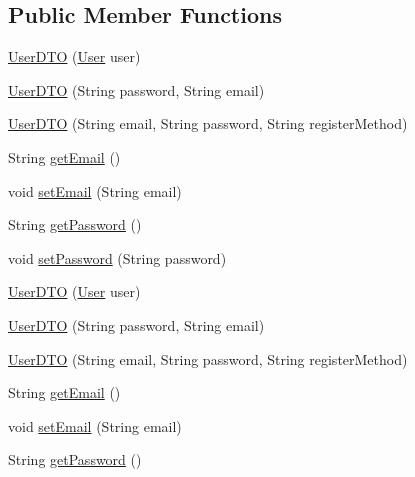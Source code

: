 \subsection*{Public Member Functions}
\begin{DoxyCompactItemize}
\item 
\mbox{\hyperlink{class_s_p_q_1_1dto_1_1_user_d_t_o_a40cad7b1dea2117ed4cb0e69fdc6b929}{User\+D\+TO}} (\mbox{\hyperlink{class_s_p_q_1_1data_1_1_user}{User}} user)
\item 
\mbox{\hyperlink{class_s_p_q_1_1dto_1_1_user_d_t_o_a985590805ac057d894623b83b1042e29}{User\+D\+TO}} (String password, String email)
\item 
\mbox{\hyperlink{class_s_p_q_1_1dto_1_1_user_d_t_o_a97b230ddb1c2eb2cbd7ced33922fb2d2}{User\+D\+TO}} (String email, String password, String register\+Method)
\item 
String \mbox{\hyperlink{class_s_p_q_1_1dto_1_1_user_d_t_o_a67038ab8bab7cb7119ece00bcb20a360}{get\+Email}} ()
\item 
void \mbox{\hyperlink{class_s_p_q_1_1dto_1_1_user_d_t_o_a3e41397e229b7f0398232747d97d6d5e}{set\+Email}} (String email)
\item 
String \mbox{\hyperlink{class_s_p_q_1_1dto_1_1_user_d_t_o_a955f436e60336683283a6fcd6fc5f874}{get\+Password}} ()
\item 
void \mbox{\hyperlink{class_s_p_q_1_1dto_1_1_user_d_t_o_a35bd2d50e194e3d923e8adcf229e5a3e}{set\+Password}} (String password)
\item 
\mbox{\hyperlink{class_s_p_q_1_1dto_1_1_user_d_t_o_a40cad7b1dea2117ed4cb0e69fdc6b929}{User\+D\+TO}} (\mbox{\hyperlink{class_s_p_q_1_1data_1_1_user}{User}} user)
\item 
\mbox{\hyperlink{class_s_p_q_1_1dto_1_1_user_d_t_o_a985590805ac057d894623b83b1042e29}{User\+D\+TO}} (String password, String email)
\item 
\mbox{\hyperlink{class_s_p_q_1_1dto_1_1_user_d_t_o_a97b230ddb1c2eb2cbd7ced33922fb2d2}{User\+D\+TO}} (String email, String password, String register\+Method)
\item 
String \mbox{\hyperlink{class_s_p_q_1_1dto_1_1_user_d_t_o_a67038ab8bab7cb7119ece00bcb20a360}{get\+Email}} ()
\item 
void \mbox{\hyperlink{class_s_p_q_1_1dto_1_1_user_d_t_o_a3e41397e229b7f0398232747d97d6d5e}{set\+Email}} (String email)
\item 
String \mbox{\hyperlink{class_s_p_q_1_1dto_1_1_user_d_t_o_a955f436e60336683283a6fcd6fc5f874}{get\+Password}} ()
\item 

\end{DoxyCompactItemize}
